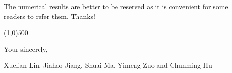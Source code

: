 \documentclass{letter}
\begin{document}
The numerical results are better to be reserved as it is convenient for some readers to refer them. Thanks!


\line(1,0){500}



Your sincerely,

Xuelian Lin, Jiahao Jiang, Shuai Ma, Yimeng Zuo and Chunming Hu



%
%
\end{document}
